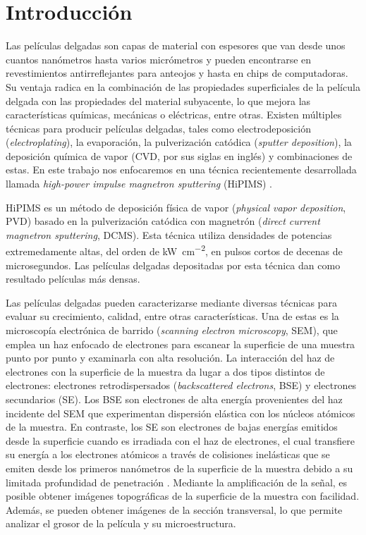 \documentclass[12pt]{IEEEtran}
\begin{document}
\section{Introducción}

Las películas delgadas son capas de material con espesores que van desde unos cuantos nanómetros hasta varios micrómetros y pueden encontrarse en revestimientos antirreflejantes para anteojos y hasta en chips de computadoras. Su ventaja radica en la combinación de las propiedades superficiales de la película delgada con las propiedades del material subyacente, lo que mejora las características químicas, mecánicas o eléctricas, entre otras. 
Existen múltiples técnicas para producir películas delgadas, tales como electrodeposición (\emph{electroplating}), la evaporación, la pulverización catódica (\emph{sputter deposition}), la deposición química de vapor  (CVD, por sus siglas en inglés) y combinaciones de estas. En este trabajo nos enfocaremos en una técnica recientemente desarrollada llamada \emph{high-power impulse magnetron sputtering} (HiPIMS) \cite{lundinHiPIMSProcess2010}.

HiPIMS es un método de deposición física de vapor (\emph{physical vapor deposition}, PVD) basado en la pulverización catódica con magnetrón (\emph{direct current magnetron sputtering}, DCMS). Esta técnica utiliza densidades de potencias extremedamente altas, del orden de \unit{\kW\per\cm^{2}}, en pulsos cortos de decenas de microsegundos. Las películas delgadas depositadas por esta técnica dan como resultado películas más densas.

Las películas delgadas pueden caracterizarse mediante diversas técnicas para evaluar su crecimiento, calidad, entre otras características. Una de estas es la microscopía electrónica de barrido (\emph{scanning electron microscopy}, SEM), que emplea un haz enfocado de electrones para escanear la superficie de una muestra punto por punto y examinarla con alta resolución. 
La interacción del haz de electrones con la superficie de la muestra da lugar a dos tipos distintos de electrones: electrones retrodispersados (\emph{backscattered electrons}, BSE) y electrones secundarios (SE). Los BSE son electrones de alta energía provenientes del haz incidente del SEM que experimentan dispersión elástica con los núcleos atómicos de la muestra. En contraste, los SE son electrones de bajas energías emitidos desde la superficie cuando es irradiada con el haz de electrones, el cual transfiere su energía a los electrones atómicos a través de colisiones inelásticas que se emiten desde los primeros nanómetros de la superficie de la muestra debido a su limitada profundidad de penetración \cite{WhichElectronDetector2023,infoInterpretingImagesScanning2022}.
Mediante la amplificación de la señal, es posible obtener imágenes topográficas de la superficie de la muestra con facilidad. Además, se pueden obtener imágenes de la sección transversal, lo que permite analizar el grosor de la película y su microestructura.
\end{document}
